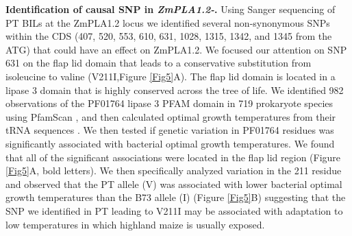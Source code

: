 \documentclass[9pt,twocolumn,twoside,lineno]{BioRxiv}
\begin{document}

\textbf{Identification of causal SNP in \textit{ZmPLA1.2-}.} Using Sanger sequencing of PT BILs at the ZmPLA1.2 locus we identified several non-synonymous SNPs within the CDS (407, 520, 553, 610, 631, 1028, 1315, 1342, and 1345 from the ATG) that could have an effect on ZmPLA1.2.
We focused our attention on SNP 631 on the flap lid domain that leads to a conservative substitution from isoleucine to valine (V211I,Figure \ref{Fig5}A).  
The flap lid domain is located in a lipase 3 domain that is highly conserved across the tree of life. 
We identified 982 observations of the PF01764 lipase 3 PFAM domain in 719 prokaryote species using PfamScan \cite{Potter2018-tk, El-Gebali2019-pw}, and then calculated optimal growth temperatures from their tRNA sequences \cite{Cimen2020-dm}.
We then tested if genetic variation in PF01764 residues was significantly associated with bacterial optimal growth temperatures. 
We found that all of the significant associations were located in the flap lid region  (Figure \ref{Fig5}A, bold letters).  
We then specifically analyzed variation in the 211 residue and observed that the PT allele (V) was associated with lower bacterial optimal growth temperatures than the B73 allele (I) (Figure \ref{Fig5}B) suggesting that the SNP we identified in PT leading to V211I may be associated with adaptation to low temperatures in which highland maize is usually exposed.
\end{document}
